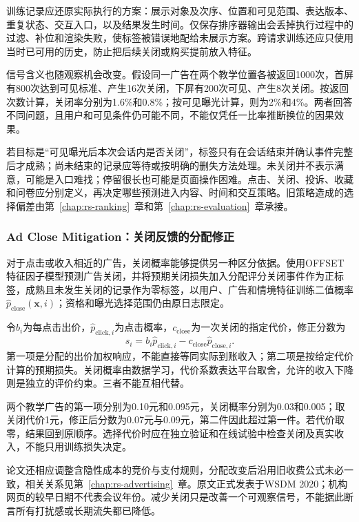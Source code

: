 训练记录应还原实际执行的方案：展示对象及次序、位置和可见范围、表达版本、重复状态、交互入口，以及结果发生时间。仅保存排序器输出会丢掉执行过程中的过滤、补位和渲染失败，使标签被错误地配给未展示方案。跨请求训练还应只使用当时已可用的历史，防止把后续关闭或购买提前放入特征。

信号含义也随观察机会改变。假设同一广告在两个教学位置各被返回1000次，首屏有800次达到可见标准、产生16次关闭，下屏有200次可见、产生8次关闭。按返回次数计算，关闭率分别为1.6\%和0.8\%；按可见曝光计算，则为2\%和4\%。两者回答不同问题，且用户和可见条件仍可能不同，不能仅凭任一比率推断换位的因果效果。

若目标是“可见曝光后本次会话内是否关闭”，标签只有在会话结束并确认事件完整后才成熟；尚未结束的记录应等待或按明确的删失方法处理。未关闭并不表示满意，可能是入口难找；停留很长也可能是页面操作困难。点击、关闭、投诉、收藏和问卷应分别定义，再决定哪些预测进入内容、时间和交互策略。旧策略造成的选择偏差由第~\ref{chap:rs-ranking}~章和第~\ref{chap:rs-evaluation}~章承接。

\Needspace{85mm}
\subsubsection{Ad Close Mitigation：关闭反馈的分配修正}
\label{sec:rs-ad-close}

对于点击或收入相近的广告，关闭概率能够提供另一种区分依据。使用OFFSET特征因子模型预测广告关闭，并将预期关闭损失加入分配评分关闭事件作为正标签，成熟且未发生关闭的记录作为零标签，以用户、广告和情境特征训练二值概率$\widehat p_{\mathrm{close}}(\bm x,i)$；资格和曝光选择范围仍由原日志限定。

令$b_i$为每点击出价，$\widehat p_{\mathrm{click},i}$为点击概率，$c_{\mathrm{close}}$为一次关闭的指定代价，修正分数为
\begin{equation}
 s_i=b_i\widehat p_{\mathrm{click},i}
     -c_{\mathrm{close}}\widehat p_{\mathrm{close},i}.
 \label{eq:rs-ad-close}
\end{equation}
第一项是分配的出价加权响应，不能直接等同实际到账收入；第二项是按给定代价计算的预期损失。关闭概率由数据学习，代价系数表达平台取舍，允许的收入下降则是独立的评价约束。三者不能互相代替。

两个教学广告的第一项分别为0.10元和0.095元，关闭概率分别为0.03和0.005；取关闭代价1元，修正后分数为0.07元与0.09元，第二件因此超过第一件。若代价取零，结果回到原顺序。选择代价时应在独立验证和在线试验中检查关闭及真实收入，不能只用训练损失决定。

论文还相应调整含隐性成本的竞价与支付规则，分配改变后沿用旧收费公式未必一致，相关关系见第~\ref{chap:rs-advertising}~章。原文正式发表于WSDM 2020；机构网页的较早日期不代表会议年份。减少关闭只是改善一个可观察信号，不能据此断言所有打扰感或长期流失都已降低。

